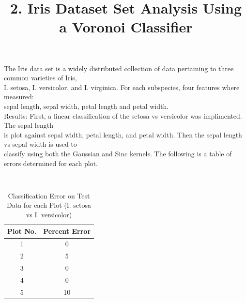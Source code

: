 \documentclass[11pt]{article}
\title{2. Iris Dataset Set Analysis Using a Voronoi Classifier}
\begin{document}
The Iris data set is a widely distributed collection of data pertaining to three common varieties of Iris,\\
I. setosa, I. versicolor, and I. virginica. For each subspecies, four features where measured:\\
sepal length, sepal width, petal length and petal width.\\

Results: First, a linear classification of the setosa vs versicolor was implimented. The sepal length \\
is plot against sepal width, petal length, and petal width. Then the sepal length vs sepal width is used to \\
classify using both the Gaussian and Sinc kernels. The following is a table of errors determined for each plot.\\
\begin{table}[ht]
\caption{Classification Error on Test Data for each Plot (I. setosa vs I. versicolor)} \\
\begin{tabular}{cc}
\hline
Plot No. & Percent Error \\[0.5ex]
\hline
1  & 0 \\
2  & 5 \\
3  & 0 \\
4  & 0 \\
5  & 10 \\
\end{tabular}
\end{table}
\end{document}

